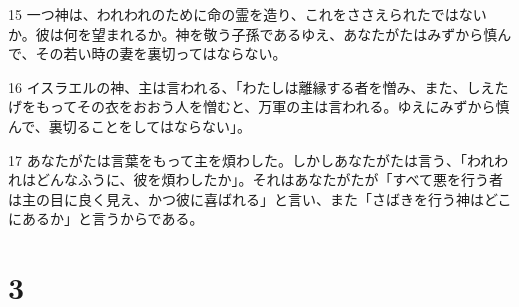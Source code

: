 \par 15 一つ神は、われわれのために命の霊を造り、これをささえられたではないか。彼は何を望まれるか。神を敬う子孫であるゆえ、あなたがたはみずから慎んで、その若い時の妻を裏切ってはならない。
\par 16 イスラエルの神、主は言われる、「わたしは離縁する者を憎み、また、しえたげをもってその衣をおおう人を憎むと、万軍の主は言われる。ゆえにみずから慎んで、裏切ることをしてはならない」。
\par 17 あなたがたは言葉をもって主を煩わした。しかしあなたがたは言う、「われわれはどんなふうに、彼を煩わしたか」。それはあなたがたが「すべて悪を行う者は主の目に良く見え、かつ彼に喜ばれる」と言い、また「さばきを行う神はどこにあるか」と言うからである。

\chapter{3}

